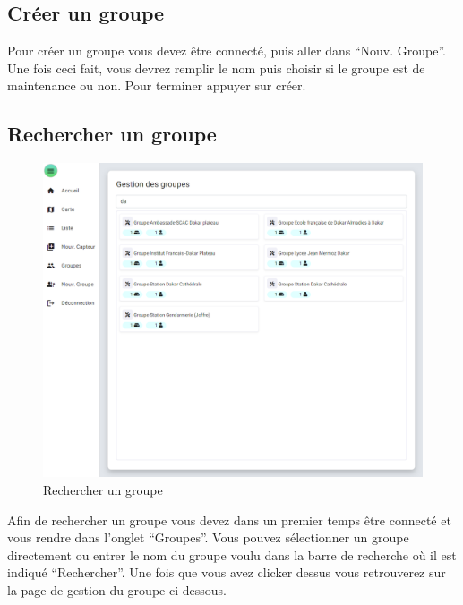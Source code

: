     \subsection{Créer un groupe}\label{subsec:creer-un-groupe}

        Pour créer un groupe vous devez être connecté, puis aller dans ``Nouv. Groupe''.
        Une fois ceci fait, vous devrez remplir le nom puis choisir si le groupe est de maintenance ou non.
        Pour terminer appuyer sur créer.

    \subsection{Rechercher un groupe}\label{subsec:rechercher-un-groupe}

        \begin{figure}[H]
            \begin{center}
                \includegraphics[width=12cm]{resources/group_search}
            \end{center}
            \caption{Rechercher un groupe}\label{fig:group-search}
        \end{figure}

        Afin de rechercher un groupe vous devez dans un premier temps être connecté et vous rendre dans l'onglet ``Groupes''.
        Vous pouvez sélectionner un groupe directement ou entrer le nom du groupe voulu dans la barre de recherche où il est indiqué ``Rechercher''.
        Une fois que vous avez clicker dessus vous retrouverez sur la page de gestion du groupe ci-dessous.


